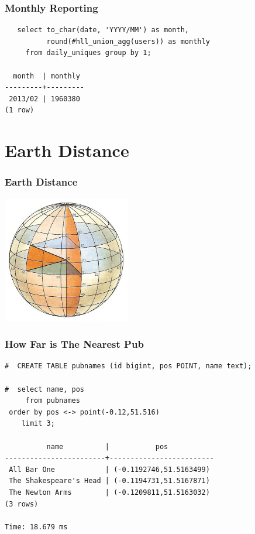 \documentclass{beamer}
\begin{document}
\begin{frame}[fragile]
  \frametitle{Monthly Reporting}

\begin{verbatim}
   select to_char(date, 'YYYY/MM') as month,
          round(#hll_union_agg(users)) as monthly
     from daily_uniques group by 1;
     
  month  | monthly 
---------+---------
 2013/02 | 1960380
(1 row)
\end{verbatim}  
\end{frame}

\section{Earth Distance}

\begin{frame}[fragile]
  \frametitle{Earth Distance}

\begin{center}
  \includegraphics[height=15em]{latitude_and_longitude.jpg}
\end{center}
\end{frame}

\begin{frame}[fragile]
  \frametitle{How Far is The Nearest Pub}

  \vfill

\begin{verbatim}
#  CREATE TABLE pubnames (id bigint, pos POINT, name text);

#  select name, pos
     from pubnames
 order by pos <-> point(-0.12,51.516)
    limit 3;

          name          |           pos           
------------------------+-------------------------
 All Bar One            | (-0.1192746,51.5163499)
 The Shakespeare's Head | (-0.1194731,51.5167871)
 The Newton Arms        | (-0.1209811,51.5163032)
(3 rows)

Time: 18.679 ms
\end{verbatim}  
\end{frame}
\end{document}
